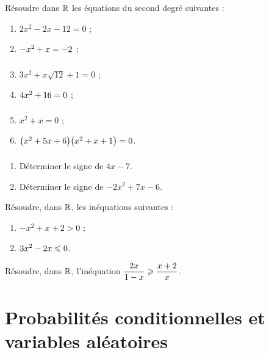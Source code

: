 \documentclass[a4paper,11pt]{article}
\begin{document}
\begin{cexercice}
Résoudre dans $\R$ les équations du second degré suivantes :
\vspace{-0.5\baselineskip}
\begin{multicols}{3}
	\begin{enumerate}
		\item $2x^2-2x-12=0$ ;
		\item $-x^2+x=-2\vphantom{1_{\tfrac11}}$ ;
		\item $3x^2+x\sqrt{12}+1=0$ ;
		\item $4x^2+16=0\vphantom{1_{\tfrac11}}$ ;
		\item $x^2+x=0$ ;
		\item $\big(x^2+5x+6\big)\big(x^2+x+1\big)=0\vphantom{1_{\tfrac11}}$.
	\end{enumerate}
\end{multicols}
\end{cexercice}

\begin{cexercice}
\vspace{-0.8\baselineskip}
\begin{enumerate}[leftmargin=*]
	\item Déterminer le signe de $4x-7$.
	\item Déterminer le signe de $-2x^2+7x-6$.
\end{enumerate}
\end{cexercice}

\begin{cexercice}
Résoudre, dans $\R$, les inéquations suivantes :
%
\begin{enumerate}
	\item $-x^2+x+2>0$ ;
	\item $3x^2-2x \leqslant 0$.
\end{enumerate}
\end{cexercice}

\begin{cexercice}
Résoudre, dans $\R$, l'inéquation $\dfrac{2x}{1-x} \geqslant \dfrac{x+2}{x}$.
\end{cexercice}

\section{Probabilités conditionnelles et variables aléatoires}
\end{document}
